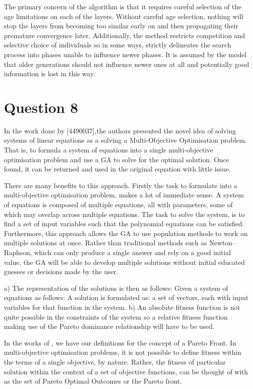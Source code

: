 \documentclass[12pt]{article}
\begin{document}
The primary concern of the algorithm is that it requires careful selection of the age limitations on each of the layers. Without careful age selection, nothing will stop the layers from becoming too similar early on and then propagating their premature convergence later. Additionally, the method restricts competition and selective choice of individuals so in some ways, strictly delineates the search process into phases unable to influence newer phases. It is assumed by the model that older generations should not influence newer ones at all and potentially good information is lost in this way. 
\section{Question 8}
In the work done by [4490037],the authors presented the novel idea of solving systems of linear equations as a solving a Multi-Objective Optimisation problem. That is, to formula a system of equations into a single multi-objective optimisation problem and use a GA to solve for the optimal solution. Once found, it can be returned and used in the original equation with little issue.

 	There are many benefits to this approach. Firstly the task to formulate into a multi-objective optimisation problem, makes a lot of immediate sense. A system of equations is composed of multiple equations, all with parameters, some of which may overlap across multiple equations. The task to solve the system, is to find a set of input variables such that the polynomial equations can be satisfied. 
 	Furthermore, this approach allows the GA to use population methods to work on multiple solutions at once. Rather than traditional methods such as  Newton–Raphson, which can only produce a single answer and rely on a good initial value, the GA will be able to develop multiple solutions without initial educated guesses or decisions made by the user.

	a) The representation of the solutions is then as follows:
	Given a system of equations as follows:
	A solution is formulated as:
	a set of vectors, each with input variables for that function in the system.
	b) An absolute fitness function is not quite possible in the constraints of the system so a relative fitness function making use of the Pareto dominance relationship will have to be used.

	In the works of \cite{nonlinearm2013}, we have our definitions for the concept of a Pareto Front. In multi-objective optimisation problems, it is not possible to define fitness within the terms of a single objective, by nature. Rather, the fitness of particular solution within the context of a set of objective functions, can be thought of with as the set of Pareto Optimal Outcomes or the Pareto front. 
\end{document}
